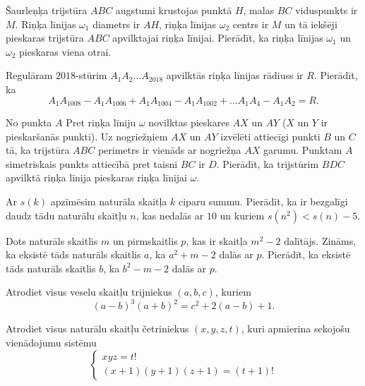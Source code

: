 \documentclass[11pt]{article}
\begin{document}
\begin{problem}[BW.TST.2019.10]
Šaurleņķa trijstūra $ABC$ augstumi krustojas punktā $H$, malas $BC$ viduspunkts ir $M$. 
Riņķa līnijas $\omega_1$ diametrs ir $AH$, riņķa līnijas $\omega_2$ centrs ir $M$ un tā 
iekšēji pieskaras trijstūra $ABC$ apvilktajai riņķa līnijai. Pierādīt, ka 
riņķa līnijas $\omega_1$ un $\omega_2$ pieskaras viena otrai.
\end{problem}

\begin{problem}[BW.TST.2019.11]
Regulāram $2018$-stūrim $A_1A_2\ldots{}A_{2018}$ apvilktās riņķa līnijas rādiuss ir $R$. 
Pierādīt, ka 
\[ A_1A_{1008} - A_1A_{1006} + A_1A_{1004} - A_1A_{1002} + \ldots A_1A_4 - A_1A_2 = R. \]
\end{problem}

\begin{problem}[BW.TST.2019.12]
No punkta $A$ Pret riņķa līniju $\omega$ novilktas pieskares $AX$ un $AY$
($X$ un $Y$ ir pieskaršanās punkti). 
Uz nogriežņiem $AX$ un $AY$ izvēlēti attiecīgi punkti $B$ un $C$ tā, ka 
trijstūra $ABC$ perimetrs ir vienāds ar nogriežņa $AX$ garumu. Punktam $A$ simetriskais
punkts attiecībā pret taisni $BC$ ir $D$. Pierādīt, ka trijstūrim $BDC$ apvilktā riņķa
līnija pieskaras riņķa līnijai $\omega$. 
\end{problem}

\begin{problem}[BW.TST.2019.13]
Ar $s(k)$ apzīmēsim naturāla skaitļa $k$ ciparu summu. Pierādīt, ka ir bezgalīgi daudz 
tādu naturālu skaitļu $n$, kas nedalās ar $10$ un kuriem $s\left( n^2 \right) < s(n) - 5$. 
\end{problem}

\begin{problem}[BW.TST.2019.14]
Dots naturāls skaitlis $m$ un pirmskaitlis $p$, kas ir skaitļa $m^2 - 2$ dalītājs. 
Zināms, ka eksistē tāds naturāls skaitlis $a$, ka $a^2 + m -2$ dalās ar $p$. 
Pierādīt, ka eksistē tāds naturāls skaitlis $b$, ka $b^2 - m - 2$ dalās ar $p$.
\end{problem}

\begin{problem}[BW.TST.2019.15]
Atrodiet visus veselu skaitļu trijniekus $(a,b,c)$, kuriem 
\[ (a-b)^3(a+b)^2 = c^2 + 2(a-b) + 1. \]
\end{problem}

\begin{problem}[BW.TST.2019.16]
Atrodiet visus naturālu skaitļu četriniekus $(x,y,z,t)$, kuri apmierina 
sekojošu vienādojumu sistēmu
\[ \left\{
\begin{array}{l}
xyz = t!\\
(x+1)(y+1)(z+1) = (t+1)!
\end{array} \right. \]
\end{problem}
\end{document}
